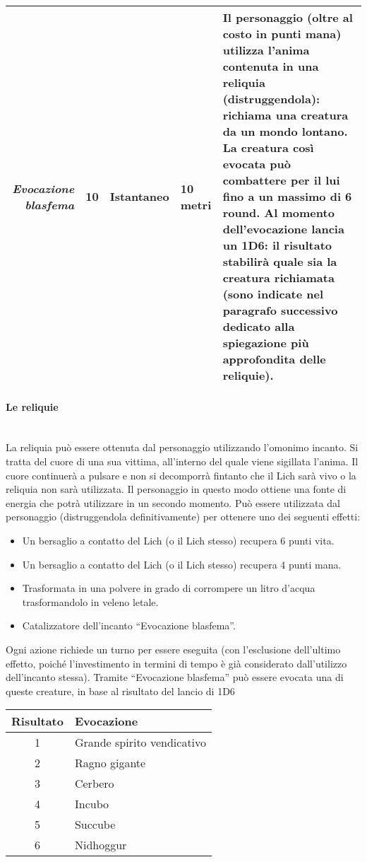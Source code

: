 \documentclass[../manuale_main.tex]{subfiles}
\begin{document}
\begin{tabularx}{\linewidth}{|N| D| T| G| Y|}
\hline
\textit{Evocazione blasfema} & 10  & Istantaneo & 10 metri &Il personaggio (oltre al costo in punti mana) utilizza l'anima contenuta in una reliquia (distruggendola): richiama una creatura da un mondo lontano. La creatura così evocata può combattere per il lui fino a un massimo di 6 round. Al momento dell'evocazione lancia un 1D6: il risultato stabilirà quale sia la creatura richiamata (sono indicate nel paragrafo successivo dedicato alla spiegazione più approfondita delle reliquie).  \\ \hline
\end{tabularx}

\paragraph{Le reliquie}\mbox{}\\
La reliquia può essere ottenuta dal personaggio utilizzando l'omonimo incanto. Si tratta del cuore di una sua vittima, all’interno del quale viene sigillata l’anima. Il cuore continuerà a pulsare e non si decomporrà fintanto che il Lich sarà vivo o la reliquia non sarà utilizzata. Il personaggio in questo modo ottiene una fonte di energia che potrà utilizzare in un secondo momento. Può essere utilizzata dal personaggio (distruggendola definitivamente) per ottenere uno dei seguenti effetti:
\begin{itemize}
\item Un bersaglio a contatto del Lich (o il Lich stesso) recupera 6 punti vita.
\item Un bersaglio a contatto del Lich (o il Lich stesso) recupera 4 punti mana.
\item Trasformata in una polvere in grado di corrompere un litro d'acqua trasformandolo in veleno letale.
\item Catalizzatore dell’incanto “Evocazione blasfema”.
\end{itemize}
Ogni azione richiede un turno per essere eseguita (con l'esclusione dell'ultimo effetto, poiché l'investimento in termini di tempo è già considerato dall'utilizzo dell’incanto stessa).
Tramite ``Evocazione blasfema'' può essere evocata una di queste creature, in base al risultato del lancio di 1D6

\begin{tabularx}{\linewidth}{|c |l|}
\hline
\textbf{Risultato}&\textbf{Evocazione}\\ \hline
1&Grande spirito vendicativo\\ \hline
2&Ragno gigante\\ \hline
3&Cerbero\\ \hline
4&Incubo\\ \hline
5&Succube\\ \hline
6&Nidhoggur\\ \hline
\end{tabularx}
\end{document}
